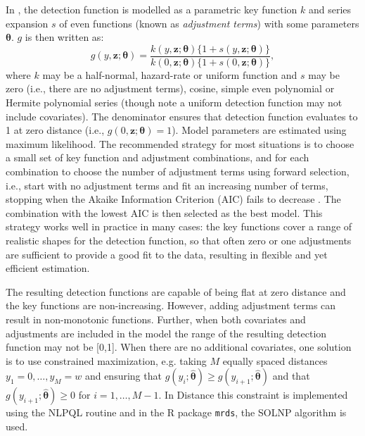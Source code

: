 \documentclass[useAMS,referee,usenatbib]{biom}
\begin{document}
In \cite{Marques:2003vb}, the detection function is modelled as a parametric key function $k$ and series expansion $s$ of even functions (known as \textit{adjustment terms}) with some parameters $\bm{\theta}$. $g$ is then written as:
\begin{equation*}
g(y, \mathbf{z}; \bm{\theta}) = \frac{k(y, \mathbf{z}; \bm{\theta}) \{1+s(y, \mathbf{z}; \bm{\theta})\}}{k(0, \mathbf{z}; \bm{\theta}) \{1+s(0, \mathbf{z}; \bm{\theta})\}},
\end{equation*}
where $k$ may be a half-normal, hazard-rate or uniform function and $s$ may be zero (i.e., there are no adjustment terms), cosine, simple even polynomial or Hermite polynomial series (though note a uniform detection function may not include covariates). The denominator ensures that detection function evaluates to 1 at zero distance (i.e., $g(0, \mathbf{z};\bm{\theta})=1$). Model parameters are estimated using maximum likelihood.  The recommended strategy for most situations is to choose a small set of key function and adjustment combinations, and for each combination to choose the number of adjustment terms using forward selection, i.e., start with no adjustment terms and fit an increasing number of terms, stopping when the Akaike Information Criterion (AIC) fails to decrease  \citep[]{Thomas:2010cf}. The combination with the lowest AIC is then selected as the best model. This strategy works well in practice in many cases: the key functions cover a range of realistic shapes for the detection function, so that often zero or one adjustments are sufficient to provide a good fit to the data, resulting in flexible and yet efficient estimation. 

The resulting detection functions are capable of being flat at zero distance and the key functions are non-increasing. However, adding adjustment terms can result in non-monotonic functions. Further, when both covariates and adjustments are included in the model the range of the resulting detection function may not be [0,1]. When there are no additional covariates, one solution is to use constrained maximization, e.g. taking $M$ equally spaced distances $y_1=0, \ldots , y_{M}=w$ and ensuring that $g(y_i;\bm{\hat{\theta}})\geq g(y_{i+1}; \bm{\hat{\theta}})$ and that $g(y_{i+1};\bm{\hat{\theta}})\geq 0$ for $i=1,\ldots,M-1$. In Distance this constraint is implemented using the NLPQL routine \cite[]{Schittkowski:1986wj} and in the \textsf{R} package \texttt{mrds}, the SOLNP algorithm \citep{Ye:1987wt} is used.
\end{document}
